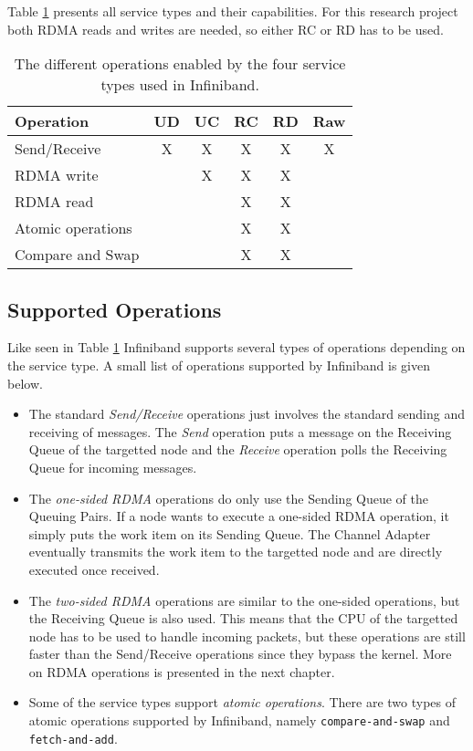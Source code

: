 Table \ref{tab:service_type_capabilities} presents all service types and their capabilities. For this research project both RDMA reads and writes are needed, so either RC or RD has to be used. 

\begin{table}[ht]
	\centering
	\begin{tabular}{| l | c | c | c | c | c |}
		\hline
		\textbf{Operation} & \textbf{UD} & \textbf{UC} & \textbf{RC} & \textbf{RD} & \textbf{Raw} \\ 
		\hline 
		Send/Receive & X & X & X & X & X \\
		RDMA write &  & X & X & X &  \\
		RDMA read &  &  & X & X &  \\
		Atomic operations &  &  & X & X & \\
		Compare and Swap &  &  & X & X & \\
		\hline
	\end{tabular}
	\caption{The different operations enabled by the four service types used in Infiniband.}
	\label{tab:service_type_capabilities}
\end{table}

\subsection{Supported Operations}
Like seen in Table \ref{tab:service_type_capabilities} Infiniband supports several types of operations depending on the service type. A small list of operations supported by Infiniband is given below.

\begin{itemize}
	\item The standard \emph{Send/Receive} operations just involves the standard sending and receiving of messages. The \emph{Send} operation puts a message on the Receiving Queue of the targetted node and the \emph{Receive} operation polls the Receiving Queue for incoming messages.

	\item The \emph{one-sided RDMA} operations do only use the Sending Queue of the Queuing Pairs. If a node wants to execute a one-sided RDMA operation, it simply puts the work item on its Sending Queue. The Channel Adapter eventually transmits the work item to the targetted node and are directly executed once received.

	\item The \emph{two-sided RDMA} operations are similar to the one-sided operations, but the Receiving Queue is also used. This means that the CPU of the targetted node has to be used to handle incoming packets, but these operations are still faster than the Send/Receive operations since they bypass the kernel. More on RDMA operations is presented in the next chapter.

	\item Some of the service types support \emph{atomic operations}. There are two types of atomic operations supported by Infiniband, namely \texttt{compare-and-swap} and \texttt{fetch-and-add}. 
\end{itemize}

